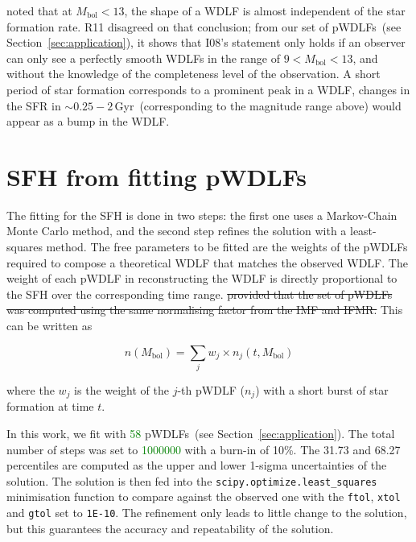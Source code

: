 \documentclass[fleqn,usenatbib]{mnras}
\begin{document}
\citet[][hereafter, I08]{2008ApJ...682L.109I} noted that at
$M_{\mathrm{bol}} < 13$, the shape of a WDLF is almost independent of the star
formation rate. R11 disagreed on that conclusion; from our set of pWDLFs~(see
Section~\ref{sec:application}), it shows that I08's statement only holds
if an observer can only see a perfectly smooth WDLFs in the range of 
$9 < M_{\mathrm{bol}} < 13$, and without the knowledge of the completeness level
of the observation. A short period of star formation corresponds to a
prominent peak in a WDLF, changes in the SFR in $\sim$$0.25-2$\,Gyr~(corresponding
to the magnitude range above) would appear as a bump in the WDLF.

\section{SFH from fitting pWDLFs}
\label{sec:fitting}
The fitting for the SFH is done in two steps: the first one uses a Markov-Chain
Monte Carlo method, and the second step refines the solution with a least-squares
method. The free parameters to be fitted are the weights of the pWDLFs required 
to compose a theoretical WDLF that matches the observed WDLF. The weight of
each pWDLF in reconstructing the WDLF is directly proportional to the SFH
\textcolor{nick}{over the corresponding time range}.
\sout{provided that the set of pWDLFs was computed using the same normalising factor
from the IMF and IFMR.}
This can be written as

\begin{equation}
    n(M_\mathrm{bol}) = \sum_j w_j \times n_j(t, M_\mathrm{bol})    
\end{equation}

where the $w_j$ is the weight of the $j$-th pWDLF ($n_j$) with a short burst of
star formation at time $t$.

In this work, we fit with \textcolor{green}{58} pWDLFs~(see Section~\ref{sec:application}). 
The total number of steps was set to \textcolor{green}{1000000} with a burn-in of
10\%. The 31.73 and 68.27 percentiles are computed as the upper and lower 1-sigma 
uncertainties of the solution. The solution is then fed into the 
\texttt{scipy.optimize.least\_squares} minimisation function to compare against
the observed one with the \texttt{ftol}, \texttt{xtol} and \texttt{gtol} set to
\texttt{1E-10}. The refinement only leads to little change to the solution, but
this guarantees the accuracy and repeatability of the solution.
\end{document}
